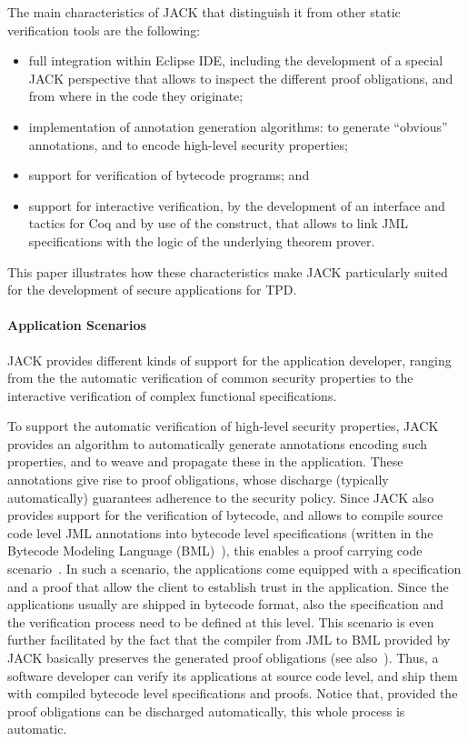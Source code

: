 The main characteristics of JACK that distinguish it from other static
verification tools are the following:
\begin{itemize}
\item full integration within Eclipse IDE, including the development of a
special JACK perspective that allows to inspect the different proof
obligations, and from where in the code they originate;
\item implementation of annotation generation algorithms: to
generate ``obvious'' annotations, and to encode high-level security
properties;
\item support for verification of bytecode programs; and
\item support for interactive verification, by the development of an interface
and tactics for Coq and by use of the \native construct, that allows to
link JML specifications with the logic of the underlying theorem
prover. 
\end{itemize}
This paper illustrates how these characteristics make JACK
particularly suited for the development of secure applications for
TPD.

\paragraph{Application Scenarios}
JACK provides different kinds of support for the application
developer, ranging from the the automatic verification of common
security properties to the interactive verification of complex
functional specifications.

To support the automatic verification of high-level security
properties, JACK provides an algorithm to automatically generate
annotations encoding such properties, and to weave and propagate these
in the application. These annotations give rise to proof obligations,
whose discharge (typically automatically) guarantees adherence to the
security policy. Since JACK also provides support for the verification
of bytecode, and allows to compile source code level JML annotations
into bytecode level specifications (written in the Bytecode Modeling
Language (BML)~\cite{BurdyHP07}), this enables a proof carrying code
scenario~\cite{Necula97}. In such a scenario, the applications come
equipped with a specification and a proof that allow the client to
establish trust in the application. Since the applications usually are
shipped in bytecode format, also the specification and the
verification process need to be defined at this level. This scenario
is even further facilitated by the fact that the compiler from JML to
BML provided by JACK basically preserves the generated proof
obligations (see also~\cite{gta05:fast}). Thus, a software developer
can verify its applications at source code level, and ship them with
compiled bytecode level specifications and proofs. Notice that,
provided the proof obligations can be discharged automatically, this
whole process is automatic.

